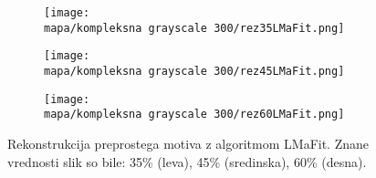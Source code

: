 \begin{figure}[!ht]
    \begin{subfigure}{0.325\linewidth}
        \texttt{[image: \\mapa/kompleksna grayscale 300/rez35LMaFit.png]}
    \end{subfigure}
    \hfill
    \begin{subfigure}{0.325\linewidth}
        \texttt{[image: \\mapa/kompleksna grayscale 300/rez45LMaFit.png]}
    \end{subfigure}
    \hfill
    \begin{subfigure}{0.325\linewidth}
        \texttt{[image: \\mapa/kompleksna grayscale 300/rez60LMaFit.png]}
    \end{subfigure}
    \caption{Rekonstrukcija preprostega motiva z algoritmom LMaFit. Znane vrednosti slik so bile: 35\% (leva), 45\% (sredinska), 60\% (desna).}
\end{figure}